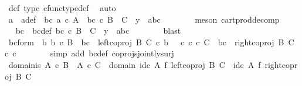 \begin{isabellebody}
\ {\isasymphi}{\isacharunderscore}{\kern0pt}def\ {\isasymphi}{\isacharunderscore}{\kern0pt}type\ cfunc{\isacharunderscore}{\kern0pt}type{\isacharunderscore}{\kern0pt}def\ \isamarkupfalse%
\ auto\isanewline
\ \ \ \ \isamarkupfalse%
\ \isamarkupfalse%
\ a\ \ a{\isacharunderscore}{\kern0pt}def{\isacharcolon}{\kern0pt}\ {\isachardoublequoteopen}{\isasymexists}\ bc{\isachardot}{\kern0pt}\ a\ {\isasymin}\isactrlsub c\ A\ {\isasymand}\ bc\ {\isasymin}\isactrlsub c\ B\ {\isasymCoprod}\ C\ {\isasymand}\ y\ {\isacharequal}{\kern0pt}\ {\isasymlangle}a{\isacharcomma}{\kern0pt}bc{\isasymrangle}{\isachardoublequoteclose}\isanewline
\ \ \ \ \ \ \isamarkupfalse%
\ {\isacharparenleft}{\kern0pt}meson\ cart{\isacharunderscore}{\kern0pt}prod{\isacharunderscore}{\kern0pt}decomp{\isacharparenright}{\kern0pt}\isanewline
\ \ \ \ \isamarkupfalse%
\ \isamarkupfalse%
\ bc\ \ bc{\isacharunderscore}{\kern0pt}def{\isacharcolon}{\kern0pt}\ {\isachardoublequoteopen}bc\ {\isasymin}\isactrlsub c\ {\isacharparenleft}{\kern0pt}B\ {\isasymCoprod}\ C{\isacharparenright}{\kern0pt}\ {\isasymand}\ y\ {\isacharequal}{\kern0pt}\ {\isasymlangle}a{\isacharcomma}{\kern0pt}bc{\isasymrangle}{\isachardoublequoteclose}\isanewline
\ \ \ \ \ \ \isamarkupfalse%
\ blast\isanewline
\ \ \ \ \isamarkupfalse%
\ bc{\isacharunderscore}{\kern0pt}form{\isacharcolon}{\kern0pt}\ {\isachardoublequoteopen}{\isacharparenleft}{\kern0pt}{\isasymexists}\ b{\isachardot}{\kern0pt}\ b\ {\isasymin}\isactrlsub c\ B\ {\isasymand}\ bc\ {\isacharequal}{\kern0pt}\ left{\isacharunderscore}{\kern0pt}coproj\ B\ C\ {\isasymcirc}\isactrlsub c\ b{\isacharparenright}{\kern0pt}\ {\isasymor}\ {\isacharparenleft}{\kern0pt}{\isasymexists}\ c{\isachardot}{\kern0pt}\ c\ {\isasymin}\isactrlsub c\ C\ {\isasymand}\ bc\ {\isacharequal}{\kern0pt}\ right{\isacharunderscore}{\kern0pt}coproj\ B\ C\ {\isasymcirc}\isactrlsub c\ c{\isacharparenright}{\kern0pt}{\isachardoublequoteclose}\isanewline
\ \ \ \ \ \ \isamarkupfalse%
\ {\isacharparenleft}{\kern0pt}simp\ add{\isacharcolon}{\kern0pt}\ bc{\isacharunderscore}{\kern0pt}def\ coprojs{\isacharunderscore}{\kern0pt}jointly{\isacharunderscore}{\kern0pt}surj{\isacharparenright}{\kern0pt}\isanewline
\ \ \ \ \isamarkupfalse%
\ domain{\isacharunderscore}{\kern0pt}is{\isacharcolon}{\kern0pt}\ {\isachardoublequoteopen}{\isacharparenleft}{\kern0pt}A\ {\isasymtimes}\isactrlsub c\ B{\isacharparenright}{\kern0pt}\ {\isasymCoprod}\ {\isacharparenleft}{\kern0pt}A\ {\isasymtimes}\isactrlsub c\ C{\isacharparenright}{\kern0pt}\ {\isacharequal}{\kern0pt}\ domain\ {\isacharparenleft}{\kern0pt}{\isacharparenleft}{\kern0pt}id\isactrlsub c\ A\ {\isasymtimes}\isactrlsub f\ left{\isacharunderscore}{\kern0pt}coproj\ B\ C{\isacharparenright}{\kern0pt}\ {\isasymamalg}\ {\isacharparenleft}{\kern0pt}id\isactrlsub c\ A\ {\isasymtimes}\isactrlsub f\ right{\isacharunderscore}{\kern0pt}coproj\ B\ C{\isacharparenright}{\kern0pt}{\isacharparenright}{\kern0pt}{\isachardoublequoteclose}\isanewline

\end{isabellebody}
